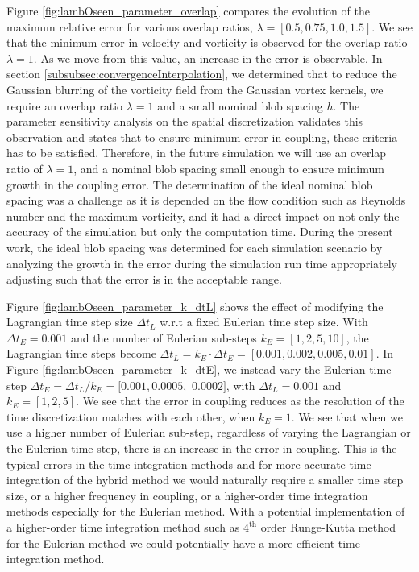 Figure \ref{fig:lambOseen_parameter_overlap} compares the evolution of the maximum relative error for various overlap ratios, $\lambda = [0.5, 0.75, 1.0, 1.5]$. We see that the minimum error in velocity and vorticity is observed for the overlap ratio $\lambda = 1$. As we move from this value, an increase in the error is observable. In section \ref{subsubsec:convergenceInterpolation}, we determined that to reduce the Gaussian blurring of the vorticity field from the Gaussian vortex kernels, we require an overlap ratio $\lambda=1$ and a small nominal blob spacing $h$. The parameter sensitivity analysis on the spatial discretization validates this observation and states that to ensure minimum error in coupling, these criteria has to be satisfied. Therefore, in the future simulation we will use an overlap ratio of $\lambda=1$, and a nominal blob spacing small enough to ensure minimum growth in the coupling error. The determination of the ideal nominal blob spacing was a challenge as it is depended on the flow condition such as Reynolds number and the maximum vorticity, and it had a direct impact on not only the accuracy of the simulation but only the computation time. During the present work, the ideal blob spacing was determined for each simulation scenario by analyzing the growth in the error during the simulation run time appropriately adjusting such that the error is in the acceptable range.

Figure \ref{fig:lambOseen_parameter_k_dtL} shows the effect of modifying the Lagrangian time step size $\Delta t_L$ w.r.t a fixed Eulerian time step size. With $\Delta t_E=0.001$ and the number of Eulerian sub-steps $k_E = [1,2,5,10]$, the Lagrangian time steps become $\Delta t_L = k_E\cdot\Delta t_E = [0.001,0.002,0.005,0.01]$. In Figure \ref{fig:lambOseen_parameter_k_dtE}, we instead vary the Eulerian time step $\Delta t_E = \Delta t_L/k_E = [0.001,0.0005,$ $0.0002]$, with $\Delta t_L=0.001$ and $k_E = [1,2,5]$. We see that the error in coupling reduces as the resolution of the time discretization matches with each other, when $k_E = 1$. We see that when we use a higher number of Eulerian sub-step, regardless of varying the Lagrangian or the Eulerian time step, there is an increase in the error in coupling. This is the typical errors in the time integration methods and for more accurate time integration of the hybrid method we would naturally require a smaller time step size, or a higher frequency in coupling, or a higher-order time integration methods especially for the Eulerian method. With a potential implementation of a higher-order time integration method such as $4^{\mathrm{th}}$ order Runge-Kutta method for the Eulerian method we could potentially have a more efficient time integration method.

